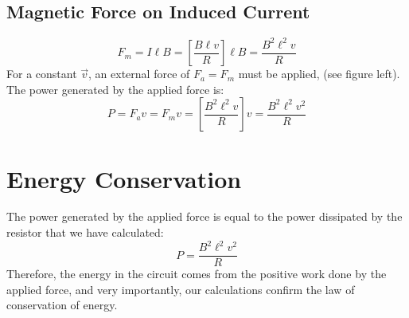 \subsection{Magnetic Force on Induced Current}

%    
%
\begin{equation}
  F_m=I\ell B = \left[\frac{B\ell v}R\right]\ell B
  =\frac{B^2\ell^2v}R
\end{equation}
For a constant $\vec v$, an external force of $F_a=F_m$ must be applied,
(see figure left). The power generated by the applied force is:
\begin{equation}
  P = F_av=F_mv=\left[\frac{B^2\ell^2v}R\right]v=\frac{B^2\ell^2v^2}R
\end{equation}



\section{Energy Conservation}


The power generated by the applied force is equal to the power dissipated by
the resistor that we have calculated:
\begin{equation}
  P = \frac{B^2\ell^2v^2}R
\end{equation}
Therefore, the energy in the circuit comes from the positive work done by the
applied force, and very importantly, our calculations confirm the law of
conservation of energy.

